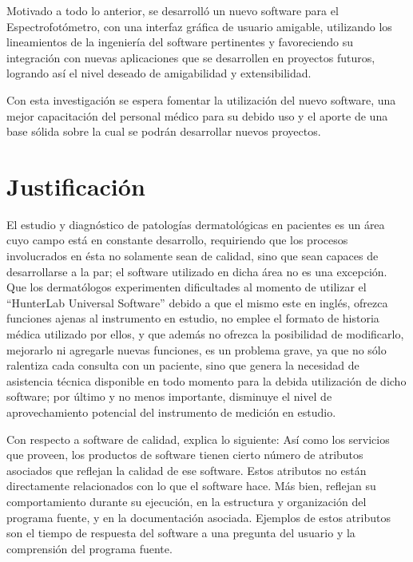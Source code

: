 Motivado a todo lo anterior, se desarroll\'{o} un nuevo software para el Espectrofot\'{o}metro, con una interfaz gr\'{a}fica de usuario amigable, utilizando los lineamientos de la ingenier\'{i}a del software pertinentes y favoreciendo su integraci\'{o}n con nuevas aplicaciones que se desarrollen en proyectos futuros, logrando as\'{i} el nivel deseado de amigabilidad y extensibilidad.

Con esta investigaci\'{o}n se espera fomentar la utilizaci\'{o}n del nuevo software, una mejor capacitaci\'{o}n del personal m\'{e}dico para su debido uso y el aporte de una base s\'{o}lida sobre la cual se podr\'{a}n desarrollar nuevos proyectos.

	\section{Justificaci\'{o}n}
El estudio y diagn\'{o}stico de patolog\'{i}as dermatol\'{o}gicas en pacientes es un \'{a}rea cuyo campo est\'{a} en constante desarrollo, requiriendo que los procesos involucrados en \'{e}sta no solamente sean de calidad, sino que sean capaces de desarrollarse a la par; el software utilizado en dicha \'{a}rea no es una excepci\'{o}n. Que los dermat\'{o}logos experimenten dificultades al momento de utilizar el ``HunterLab Universal Software'' debido a que el mismo este en ingl\'{e}s, ofrezca funciones ajenas al instrumento en estudio, no emplee el formato de historia m\'{e}dica utilizado por ellos, y que adem\'{a}s no ofrezca la posibilidad de modificarlo, mejorarlo ni agregarle nuevas funciones, es un problema grave, ya que no s\'{o}lo ralentiza cada consulta con un paciente, sino que genera la necesidad de asistencia t\'{e}cnica disponible en todo momento para la debida utilizaci\'{o}n de dicho software; por \'{u}ltimo y no menos importante, disminuye el nivel de aprovechamiento potencial del instrumento de medici\'{o}n en estudio.

Con respecto a software de calidad, \cite{Sommerville} explica lo siguiente: As\'{i} como los servicios que proveen, los productos de software tienen cierto n\'{u}mero de atributos asociados que reflejan la calidad de ese software. Estos atributos no est\'{a}n directamente relacionados con lo que el software hace. M\'{a}s bien, reflejan su comportamiento durante su ejecuci\'{o}n, en la estructura y organizaci\'{o}n del programa fuente, y en la documentaci\'{o}n asociada. Ejemplos de estos atributos son el tiempo de respuesta del software a una pregunta del usuario y la comprensi\'{o}n del programa fuente.

